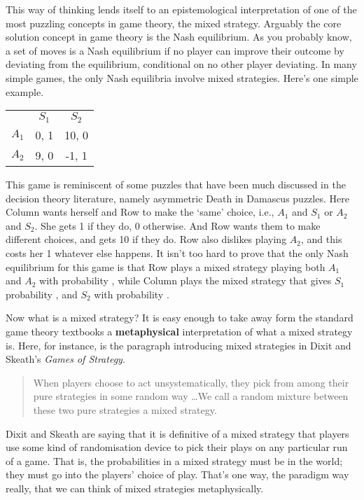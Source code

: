 This way of thinking lends itself to an epistemological interpretation of one of the most puzzling concepts in game theory, the mixed strategy. Arguably the core solution concept in game theory is the Nash equilibrium. As you probably know, a set of moves is a Nash equilibrium if no player can improve their outcome by deviating from the equilibrium, conditional on no other player deviating. In many simple games, the only Nash equilibria involve mixed strategies. Here's one simple example.

\begin{center}
\begin{tabular}{r c c}
 & $S_1$ & $S_2$ \\
$A_1$ & 0, 1 & 10, 0 \\
$A_2$ & 9, 0 & -1, 1 
\end{tabular}
\end{center}

\noindent This game is reminiscent of some puzzles that have been much discussed in the decision theory literature, namely asymmetric Death in Damascus puzzles. Here Column wants herself and Row to make the `same' choice, i.e., $A_1$ and $S_1$ or $A_2$ and $S_2$. She gets 1 if they do, 0 otherwise. And Row wants them to make different choices, and gets 10 if they do. Row also dislikes playing $A_2$, and this costs her 1 whatever else happens. It isn't too hard to prove that the only Nash equilibrium for this game is that Row plays a mixed strategy playing both $A_1$ and $A_2$ with probability , while Column plays the mixed strategy that gives $S_1$ probability , and $S_2$ with probability .

Now what is a mixed strategy? It is easy enough to take away form the standard game theory textbooks a \textbf{metaphysical} interpretation of what a mixed strategy is. Here, for instance, is the paragraph introducing mixed strategies in Dixit and Skeath's \textit{Games of Strategy}.

\begin{quote}
When players choose to act unsystematically, they pick from among their pure strategies in some random way \dots We call a random mixture between these two pure strategies a mixed strategy. \citep[186]{DixitSkeath2004}
\end{quote}
Dixit and Skeath are saying that it is definitive of a mixed strategy that players use some kind of randomisation device to pick their plays on any particular run of a game. That is, the probabilities in a mixed strategy must be in the world; they must go into the players' choice of play. That's one way, the paradigm way really, that we can think of mixed strategies metaphysically.

